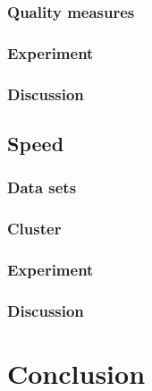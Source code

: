 \documentclass{article}
\begin{document}
\subsubsection{Quality measures}

\subsubsection{Experiment}

\subsubsection{Discussion}

\subsection{Speed}

\subsubsection{Data sets}

\subsubsection{Cluster}

\subsubsection{Experiment}

\subsubsection{Discussion}

\section{Conclusion}
\end{document}

